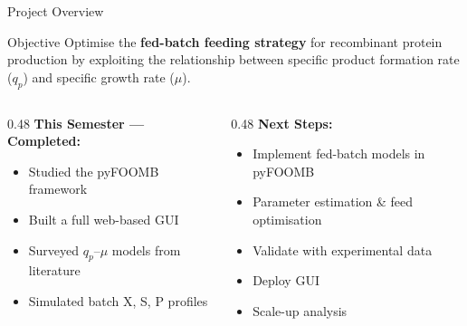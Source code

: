 \documentclass[aspectratio=169, 11pt]{beamer}
\begin{document}
\begin{frame}{Project Overview}
  \begin{block}{Objective}
    Optimise the \textbf{fed-batch feeding strategy} for recombinant protein production
    by exploiting the relationship between specific product formation rate ($q_p$)
    and specific growth rate ($\mu$).
  \end{block}

  \vspace{0.3cm}
  \begin{columns}[T]
    \begin{column}{0.48\textwidth}
      \textbf{This Semester — Completed:}
      \begin{itemize}
        \item[\textcolor{donegreen}{\checkmark}] Studied the pyFOOMB framework
        \item[\textcolor{donegreen}{\checkmark}] Built a full web-based GUI
        \item[\textcolor{donegreen}{\checkmark}] Surveyed $q_p$--$\mu$ models from literature
        \item[\textcolor{donegreen}{\checkmark}] Simulated batch X, S, P profiles
      \end{itemize}
    \end{column}
    \begin{column}{0.48\textwidth}
      \textbf{Next Steps:}
      \begin{itemize}
        \item[\textcolor{pendinggray}{$\circ$}] Implement fed-batch models in pyFOOMB
        \item[\textcolor{pendinggray}{$\circ$}] Parameter estimation \& feed optimisation
        \item[\textcolor{pendinggray}{$\circ$}] Validate with experimental data
        \item[\textcolor{pendinggray}{$\circ$}] Deploy GUI
        \item[\textcolor{pendinggray}{$\circ$}] Scale-up analysis
      \end{itemize}
    \end{column}
  \end{columns}
\end{frame}
\end{document}
